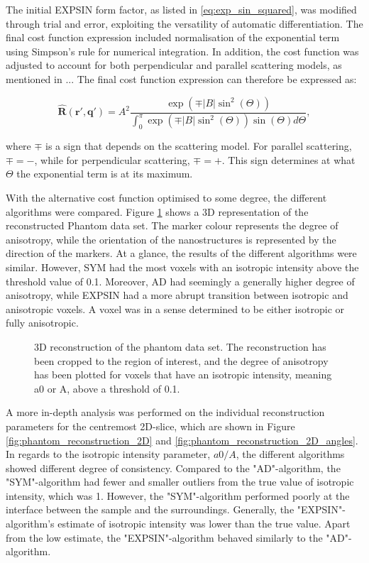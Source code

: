 The initial EXPSIN form factor, as listed in \eqref{eq:exp_sin_squared}, was modified through trial and error, exploiting the versatility of automatic differentiation.
The final cost function expression included normalisation of the exponential term using Simpson's rule for numerical integration.
In addition, the cost function was adjusted to account for both perpendicular and parallel scattering models, as mentioned in ...%
The final cost function expression can therefore be expressed as:

\begin{equation}
    \label{eq:final_exp_sin_squared}
    \bm{\widehat{R}}(\bm{r'}, \bm{q'}) = A^{2} \frac{\exp\left( \mp |B| \sin^{2}(\Theta) \right)}{\int_{0}^{\pi} \exp\left( \mp |B| \sin^{2}(\Theta) \right) \sin(\Theta) d\Theta},
\end{equation}

where $\mp$ is a sign that depends on the scattering model. For parallel scattering, $\mp = -$, while for perpendicular scattering, $\mp = +$.
This sign determines at what $\Theta$ the exponential term is at its maximum.

With the alternative cost function optimised to some degree, the different algorithms were compared.
Figure \ref{fig:phantom_reconstruction_3D} shows a 3D representation of the reconstructed Phantom data set.
The marker colour represents the degree of anisotropy, while the orientation of the nanostructures is represented by the direction of the markers.
At a glance, the results of the different algorithms were similar.
However, SYM had the most voxels with an isotropic intensity above the threshold value of 0.1. Moreover, AD had seemingly a generally higher degree of anisotropy,
while EXPSIN had a more abrupt transition between isotropic and anisotropic voxels. A voxel was in a sense determined to be either isotropic or fully anisotropic.

\begin{figure}[h!]
    \centering
    
    \caption{ 3D reconstruction of the phantom data set.
        The reconstruction has been cropped to the region of interest,
        and the degree of anisotropy has been plotted for voxels that have an isotropic intensity, meaning a0 or A, above a threshold of 0.1. }
    \label{fig:phantom_reconstruction_3D}
\end{figure}

\clearpage
A more in-depth analysis was performed on
the individual reconstruction parameters for the centremost 2D-slice, which are shown in Figure \ref{fig:phantom_reconstruction_2D} and \ref{fig:phantom_reconstruction_2D_angles}. %
In regards to the isotropic intensity parameter, $a0/A$, the different algorithms showed different degree of consistency.
Compared to the "AD"-algorithm, the "SYM"-algorithm had fewer and smaller outliers from the true value of isotropic intensity, which was 1.
However, the "SYM"-algorithm performed poorly at the interface between the sample and the surroundings.
Generally, the "EXPSIN"-algorithm's estimate of isotropic intensity was lower than the true value.
Apart from the low estimate, the "EXPSIN"-algorithm behaved similarly to the "AD"-algorithm.

